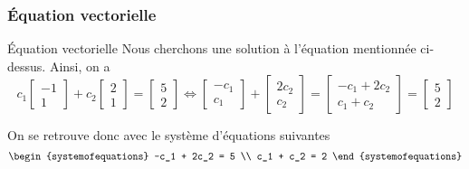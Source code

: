 \documentclass{article}
\begin{document}
\subsubsection{Équation vectorielle}

\begin{parag}{Équation vectorielle}
    Nous cherchons une solution à l'équation mentionnée ci-dessus. Ainsi, on a
    \[c_1 \begin{bmatrix} -1 \\ 1 \end{bmatrix} + c_2 \begin{bmatrix} 2 \\ 1 \end{bmatrix} = \begin{bmatrix} 5 \\ 2 \end{bmatrix} \iff \begin{bmatrix} -c_1 \\ c_1 \end{bmatrix} + \begin{bmatrix} 2c_2 \\ c_2 \end{bmatrix} = \begin{bmatrix} -c_1 + 2c_2 \\ c_1 + c_2 \end{bmatrix} = \begin{bmatrix} 5 \\ 2 \end{bmatrix} \]

    On se retrouve donc avec le système d'équations suivantes
    \[\begin{systemofequations}
    -c_1 + 2c_2 = 5 \\
    c_1 + c_2 = 2
    \end{systemofequations}\]
\end{parag}
\end{document}
